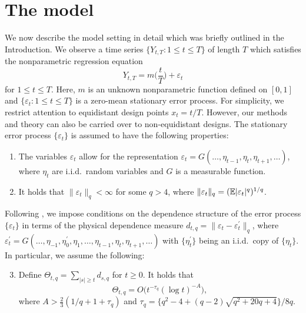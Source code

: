 
\section{The model}\label{sec-model}


We now describe the model setting in detail which was briefly outlined in the Introduction. We observe a time series $\{Y_{t,T}: 1 \le t \le T \}$ of length $T$ which satisfies the nonparametric regression equation 
\begin{equation}\label{model}
Y_{t,T} = m \Big( \frac{t}{T} \Big) + \varepsilon_t 
\end{equation}
for $1 \le t \le T$. Here, $m$ is an unknown nonparametric function defined on $[0,1]$ and $\{ \varepsilon_t: 1 \le t \le T \}$ is a zero-mean stationary error process. For simplicity, we restrict attention to equidistant design points $x_t = t/T$. However, our methods and theory can also be carried over to non-equidistant designs. The stationary error process $\{\varepsilon_t\}$ is assumed to have the following properties: 
\begin{enumerate}[label=(C\arabic*),leftmargin=1.05cm]

\item \label{C-err1} The variables $\varepsilon_t$ allow for the representation $\varepsilon_t = G(\ldots,\eta_{t-1},\eta_t,\eta_{t+1},\ldots)$, where $\eta_t$ are i.i.d.\ random variables and $G$ is a measurable function. 

\item \label{C-err2} It holds that $\| \varepsilon_t \|_q < \infty$ for some $q > 4$, where $\| \varepsilon_t \|_q = (\mathbb{E}|\varepsilon_t|^q)^{1/q}$. 

\end{enumerate}
Following \cite{Wu2005}, we impose conditions on the dependence structure of the error process $\{\varepsilon_t\}$ in terms of the physical dependence measure $d_{t,q} = \| \varepsilon_t - \varepsilon_t^\prime \|_q$, where $\varepsilon_t^\prime = G(\ldots,\eta_{-1},\eta_0^\prime,\eta_1,\ldots,\eta_{t-1},\eta_t,\eta_{t+1},\ldots)$ with $\{\eta_t^\prime\}$ being an i.i.d.\ copy of $\{\eta_t\}$. In particular, we assume the following: 
\begin{enumerate}[label=(C\arabic*),leftmargin=1.05cm]
\setcounter{enumi}{2}

\item \label{C-err3} Define $\Theta_{t,q} = \sum\nolimits_{|s| \ge t} d_{s,q}$ for $t \ge 0$. It holds that 
\[ \Theta_{t,q} = O \big( t^{-\tau_q} (\log t)^{-A} \big), \] 
where $A > \frac{2}{3} (1/q + 1 + \tau_q)$ and $\tau_q = \{q^2 - 4 + (q-2) \sqrt{q^2 + 20q + 4}\} / 8q$. 

\end{enumerate}
